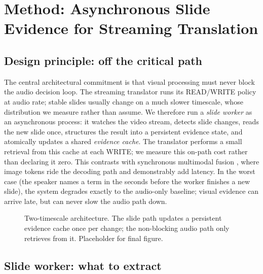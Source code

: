\section{Method: Asynchronous Slide Evidence for Streaming Translation}
\label{sec:method}

\subsection{Design principle: off the critical path}

The central architectural commitment is that visual processing must never block
the audio decision loop. The streaming translator runs its READ/WRITE policy at
audio rate; stable slides usually change on a much slower timescale, whose
distribution we measure rather than assume. We therefore run a
\emph{slide worker} as an asynchronous process: it watches the video stream,
detects slide changes, reads the new slide once, structures the result into a
persistent evidence state, and atomically updates a shared \emph{evidence
cache}. The translator performs a small retrieval from this cache at each WRITE;
we measure this on-path cost rather than declaring it zero. This contrasts with
synchronous multimodal fusion
\citep{koneru2025omnifusion}, where image tokens ride the decoding path and
demonstrably add latency. In the worst case (the speaker names a term in the
seconds before the worker finishes a new slide), the system degrades exactly to
the audio-only baseline; visual evidence can arrive late, but can never slow
the audio path down.

\begin{figure}[t]
\centering
{}
\caption{Two-timescale architecture. The slide path updates a persistent
evidence cache once per change; the non-blocking audio path only retrieves from
it. Placeholder for final figure.}
\label{fig:overview}
\end{figure}

\subsection{Slide worker: what to extract}

